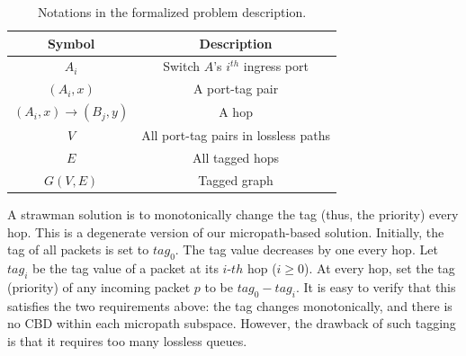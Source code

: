 \begin{table}
\small
\centering
\caption{Notations in the formalized problem description.}
\label{tab:symbols}
\begin{tabular}{|c|c|}
\hline
Symbol & Description \\ \hline
$A_i$ & Switch $A$'s $i^{th}$ ingress port  \\ \hline
$(A_i, x)$ & A port-tag pair \\ \hline
$(A_i, x)\rightarrow(B_j, y)$ & A hop \\ \hline
$V$ & All port-tag pairs in lossless paths  \\ \hline
$E$ & All tagged hops \\ \hline
$G(V, E)$ & Tagged graph \\ \hline
\end{tabular}
\end{table}

 A strawman solution is to monotonically change the tag (thus, the priority) every hop.
This is a degenerate version of our micropath-based solution.
Initially, the tag of all packets is set to $tag_0$. The tag value decreases by one every hop. 
Let $tag_i$ be the tag value of a packet at its $i$-$th$ hop ($i \geq 0$). At every hop, 
set the tag (priority) of any incoming packet $p$ to be $tag_0 - tag_i$. 
It is easy to verify that this satisfies the two requirements above: the tag changes monotonically, and there is no CBD
within each micropath subspace.
However, the drawback of such tagging is that it requires too many lossless queues. 
\fi





